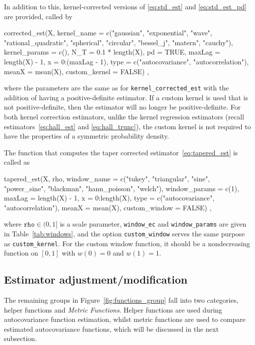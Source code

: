 In addition to this, kernel-corrected versions of \eqref{eq:std_est} and \eqref{eq:std_est_pd} are provided, called by
\begin{example}
corrected_est(X, kernel_name = c("gaussian", "exponential", "wave",
        "rational_quadratic", "spherical", "circular", "bessel_j", "matern", "cauchy"),
        kernel_params = c(), N_T = 0.1 * length(X), pd = TRUE, maxLag = length(X) - 1,
        x = 0:(maxLag - 1), type = c("autocovariance", "autocorrelation"),
        meanX = mean(X), custom_kernel = FALSE) ,
\end{example}
where the parameters are the same as for \texttt{kernel\_corrected\_est} with the addition of having a positive-definite estimator. If a custom kernel is used that is not positive-definite, then the estimator will no longer be positive-definite.
For both kernel correction estimators, unlike the kernel regression estimators (recall estimators~\eqref{eq:hall_est} and \eqref{eq:hall_trunc}), the custom kernel is not required to have the properties of a symmetric probability density. 

The function that computes the taper corrected estimator~\eqref{eq:tapered_est} is called as
\begin{example}
tapered_est(X, rho, window_name = c("tukey", "triangular", "sine", "power_sine",
        "blackman", "hann_poisson", "welch"), window_params = c(1),
        maxLag = length(X) - 1, x = 0:length(X),
        type = c("autocovariance", "autocorrelation"), meanX = mean(X),
        custom_window = FALSE) ,
\end{example}
where \(\texttt{rho} \in (0, 1]\) is a scale parameter, \texttt{window\_ec} and \texttt{window\_params} are given in Table~\ref{tab:windows}, and the option \texttt{custom\_window} serves the same purpose as \texttt{custom\_kernel}. For the custom window function, it should be a nondecreasing function on \([0, 1]\) with \(w(0) = 0\) and \(w(1) = 1.\)


\subsection{Estimator adjustment/modification}
The remaining groups in Figure~\ref{fig:functions_group} fall into two categories, helper functions and \textit{Metric Functions}.
Helper functions are used during autocovariance function estimation, whilst metric functions are used to compare estimated autocovariance functions, which will be discussed in the next subsection.

